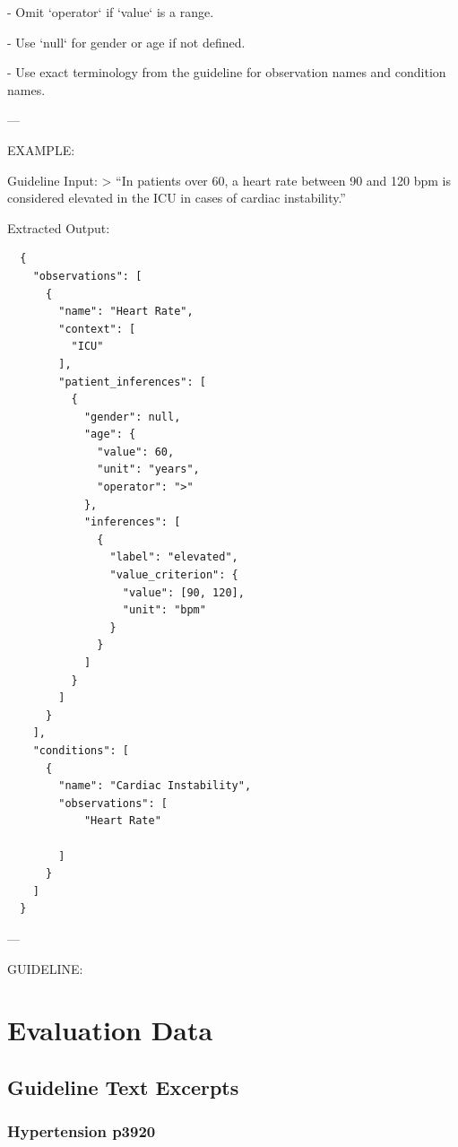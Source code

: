 \documentclass[bs, english]{stthesis}
\begin{document}
- Omit `operator` if `value` is a range.

- Use `null` for gender or age if not defined.

- Use exact terminology from the guideline for observation names and condition names.

---

EXAMPLE:

Guideline Input:
> “In patients over 60, a heart rate between 90 and 120 bpm is considered elevated in the ICU in cases of cardiac instability.”

Extracted Output:
\begin{verbatim}
  {
    "observations": [
      {
        "name": "Heart Rate",
        "context": [
          "ICU"
        ],
        "patient_inferences": [
          {
            "gender": null,
            "age": {
              "value": 60,
              "unit": "years",
              "operator": ">"
            },
            "inferences": [
              {
                "label": "elevated",
                "value_criterion": {
                  "value": [90, 120],
                  "unit": "bpm"
                }
              }
            ]
          }
        ]
      }
    ],
    "conditions": [
      {
        "name": "Cardiac Instability",
        "observations": [
            "Heart Rate"
          
        ]
      }
    ]
  }
\end{verbatim}

---

GUIDELINE:

\section{Evaluation Data}

\subsection{Guideline Text Excerpts}
\label{sec:guidelineText}
\subsubsection*{Hypertension p3920}
\end{document}
